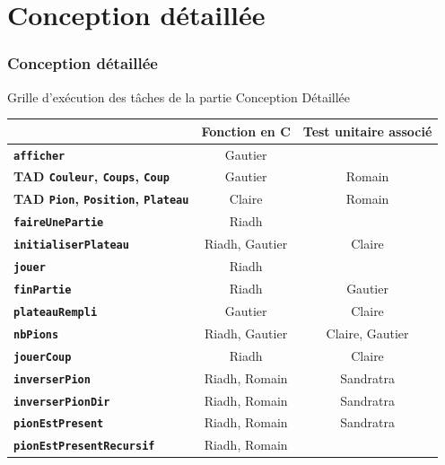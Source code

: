 \documentclass{beamer}
\begin{document}
		\section{Conception détaillée}
	\begin{frame}[label=cd] %
	\frametitle{Conception détaillée}
	\begin{alertblock}{Grille d’exécution des tâches de la partie Conception Détaillée}
   	\rightskip=0pt\leftskip=0pt
	{\tiny \begin{table}[h]
\begin{center}
\begin{tabular}{c|c|c|}
  \cline{2-3}
   & \textbf{Fonction en C} & \textbf{Test unitaire associé} \\ \hline
  \multicolumn{1}{|l|}{\textbf{\texttt{afficher}}} & Gautier & \cellcolor{lightgray} \\ \hline
  \multicolumn{1}{|l|}{\textbf{TAD \texttt{Couleur}, \texttt{Coups}, \texttt{Coup}}} & Gautier & Romain \\ \hline
  \multicolumn{1}{|l|}{\textbf{TAD \texttt{Pion}, \texttt{Position}, \texttt{Plateau}}} & Claire & Romain \\ \hline
  \multicolumn{1}{|l|}{\textbf{\texttt{faireUnePartie}}} & Riadh & \cellcolor{lightgray} \\ \hline
  \multicolumn{1}{|l|}{\textbf{\texttt{initialiserPlateau}}} & Riadh, Gautier & Claire \\ \hline
 \multicolumn{1}{|l|}{ \textbf{\texttt{jouer}}} & Riadh & \cellcolor{lightgray} \\ \hline
 \multicolumn{1}{|l|}{ \textbf{\texttt{finPartie}}} & Riadh & Gautier \\ \hline
  \multicolumn{1}{|l|}{\textbf{\texttt{plateauRempli}}} & Gautier & Claire \\ \hline
  \multicolumn{1}{|l|}{\textbf{\texttt{nbPions}}} & Riadh, Gautier & Claire, Gautier \\ \hline
  \multicolumn{1}{|l|}{\textbf{\texttt{jouerCoup}}} & Riadh & Claire \\ \hline
  \multicolumn{1}{|l|}{\textbf{\texttt{inverserPion}}} & Riadh, Romain & Sandratra \\ \hline
  \multicolumn{1}{|l|}{\textbf{\texttt{inverserPionDir}}} & Riadh, Romain & Sandratra\\ \hline
  \multicolumn{1}{|l|}{\textbf{\texttt{pionEstPresent}}} & Riadh, Romain & Sandratra \\ \hline
 \multicolumn{1}{|l|}{ \textbf{\texttt{pionEstPresentRecursif}}} & Riadh, Romain & \cellcolor{lightgray} \\ \hline

\end{tabular}
\end{center}
\end{table}}
\end{alertblock}
\end{frame}
\end{document}
